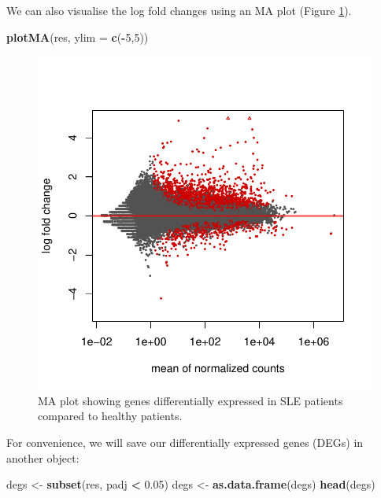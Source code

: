 \documentclass[9pt,a4paper,]{extarticle}
\newenvironment{Shaded}{\begin{snugshade}}{\end{snugshade}}
\newcommand{\KeywordTok}[1]{\textcolor[rgb]{0.13,0.29,0.53}{\textbf{#1}}}
\newcommand{\DataTypeTok}[1]{\textcolor[rgb]{0.13,0.29,0.53}{#1}}
\newcommand{\DecValTok}[1]{\textcolor[rgb]{0.00,0.00,0.81}{#1}}
\newcommand{\FloatTok}[1]{\textcolor[rgb]{0.00,0.00,0.81}{#1}}
\newcommand{\StringTok}[1]{\textcolor[rgb]{0.31,0.60,0.02}{#1}}
\newcommand{\OperatorTok}[1]{\textcolor[rgb]{0.81,0.36,0.00}{\textbf{#1}}}
\newcommand{\NormalTok}[1]{#1}
\begin{document}
We can also visualise the log fold changes using an MA plot (Figure \ref{fig:maplot}).

\begin{Shaded}
\begin{Highlighting}[]
\KeywordTok{plotMA}\NormalTok{(res, }\DataTypeTok{ylim =} \KeywordTok{c}\NormalTok{(}\OperatorTok{-}\DecValTok{5}\NormalTok{,}\DecValTok{5}\NormalTok{))}
\end{Highlighting}
\end{Shaded}

\begin{figure}

{\centering \includegraphics{biocondutor-regulatory-genomics-workflow_files/figure-latex/maplot-1} 

}

\caption{MA plot showing genes differentially expressed in SLE patients compared to healthy patients.}\label{fig:maplot}
\end{figure}

For convenience, we will save our differentially expressed genes (DEGs) in another object:

\begin{Shaded}
\begin{Highlighting}[]
\NormalTok{degs <-}\StringTok{ }\KeywordTok{subset}\NormalTok{(res, padj }\OperatorTok{<}\StringTok{ }\FloatTok{0.05}\NormalTok{)}
\NormalTok{degs <-}\StringTok{ }\KeywordTok{as.data.frame}\NormalTok{(degs)}
\KeywordTok{head}\NormalTok{(degs)}
\end{Highlighting}
\end{Shaded}
\end{document}
